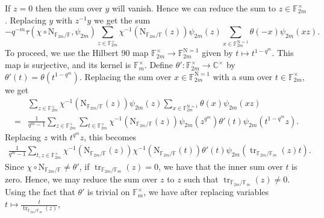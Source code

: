 \documentclass[12pt, reqno]{amsart}
\theoremstyle{definition}
\theoremstyle{definition}
\theoremstyle{definition}
\newcommand{\cComplex}{\mathbb{C}}
\newcommand{\multiplicativegroup}[1]{#1^{\times}}
\newcommand{\fieldCharacter}{\psi}
\newcommand{\trace}{\operatorname{tr}}
\newcommand{\aFieldNorm}{\mathrm{N}}
\newcommand{\finiteField}{\mathbb{F}}
\newcommand{\finiteFieldExtension}[1]{\finiteField_{#1}}
\newcommand{\NormOneGroup}[1]{\finiteFieldExtension{#1}^{\aFieldNorm = 1}}
\begin{document}
If $z=0$ then the sum over $y$ will vanish. Hence we can reduce the sum to $z \in \multiplicativegroup{\finiteFieldExtension{2m}}$. Replacing $y$ with $z^{-1} y$ we get the sum
$$-q^{-m} \tau\left(\chi \circ \aFieldNorm_{\finiteFieldExtension{2m} \slash \finiteField}, \fieldCharacter_{2m}\right) \sum_{z \in \multiplicativegroup{\finiteFieldExtension{2m}}} \chi^{-1}\left(\aFieldNorm_{\finiteFieldExtension{2m} \slash \finiteField}\left(z\right)\right) \fieldCharacter_{2m}\left(z\right)  \sum_{x \in \NormOneGroup{2m}} \theta \left(-x\right) \fieldCharacter_{2m}\left(xz\right).$$
To proceed, we use the Hilbert 90 map $\multiplicativegroup{\finiteFieldExtension{2m}} \to \NormOneGroup{2m}$ given by $t \mapsto t^{1 - q^m}$. This map is surjective, and its kernel is $\multiplicativegroup{\finiteFieldExtension{m}}$. Define $\theta' \colon \multiplicativegroup{\finiteFieldExtension{2m}} \to \multiplicativegroup{\cComplex}$ by $\theta'\left(t\right) = \theta\left(t^{1-q^m}\right)$. Replacing the sum over $x \in \NormOneGroup{2m}$ with a sum over $t \in \multiplicativegroup{\finiteFieldExtension{2m}}$, we get \begin{align*}
	& \sum_{z \in \multiplicativegroup{\finiteFieldExtension{2m}}} \chi^{-1}\left(\aFieldNorm_{\finiteFieldExtension{2m} \slash \finiteField}\left(z\right)\right) \fieldCharacter_{2m}\left(z\right) \sum_{x \in \NormOneGroup{2m}} \theta \left(x\right) \fieldCharacter_{2m}\left(xz\right) \\
	= & \frac{1}{q^m-1}\sum_{z \in \multiplicativegroup{\finiteFieldExtension{2m}}} \sum_{t \in \multiplicativegroup{\finiteFieldExtension{2m}}} \chi^{-1}\left(\aFieldNorm_{\finiteFieldExtension{2m} \slash \finiteField}\left(z\right)\right) \fieldCharacter_{2m}\left(z^{q^m}\right) \theta' \left(t\right) \fieldCharacter_{2m}\left(t^{1-q^m} z\right).
\end{align*}
Replacing $z$ with $t^{q^m} z$, this becomes
\begin{align*}
	\frac{1}{q^m-1}\sum_{t,z \in \multiplicativegroup{\finiteFieldExtension{2m}}} \chi^{-1}\left(\aFieldNorm_{\finiteFieldExtension{2m} \slash \finiteField}\left(z\right)\right) \chi^{-1}\left(\aFieldNorm_{\finiteFieldExtension{2m} \slash \finiteField}\left(t\right)\right) \theta' \left(t\right) \fieldCharacter_{2m}\left(\trace_{\finiteFieldExtension{2m} \slash \finiteFieldExtension{m}}\left(z\right) t\right).
\end{align*}
Since $\chi \circ \aFieldNorm_{\finiteFieldExtension{2m} \slash \finiteField} \ne \theta'$, if $\trace_{\finiteFieldExtension{2m} \slash \finiteFieldExtension{m}}\left(z\right) = 0$, we have that the inner sum over $t$ is zero. Hence, we may reduce the sum over $z$ to $z$ such that $\trace_{\finiteFieldExtension{2m} \slash \finiteFieldExtension{m}}\left(z\right) \ne 0$. Using the fact that $\theta'$ is trivial on $\multiplicativegroup{\finiteFieldExtension{m}}$, we have after replacing variables $t \mapsto \frac{t}{\trace_{\finiteFieldExtension{2m} \slash \finiteFieldExtension{m}}\left(z\right)}$,
\end{document}

